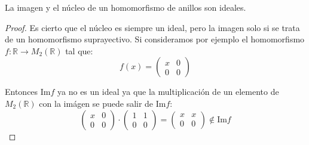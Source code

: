 \begin{ce}
    La imagen y el núcleo de un homomorfismo de anillos son ideales.
\end{ce}

\begin{proof}
    Es cierto que el núcleo es siempre un ideal, pero la imagen solo si se trata de un homomorfismo suprayectivo. Si consideramos por ejemplo el homomorfismo $f:\mathbb{R} \to M_{2}(\mathbb{R})$ tal que:
    \begin{equation}
        f(x) = \begin{pmatrix}
            x & 0\\
            0 & 0
        \end{pmatrix} 
    \end{equation}

    Entonces $\text{Im} f$ ya no es un ideal ya que la multiplicación de un elemento de $M_{2}(\mathbb{R})$ con la imágen se puede salir de $\text{Im} f$:
    \begin{equation}
        \begin{pmatrix}
            x & 0\\
            0 & 0
        \end{pmatrix} 
        \cdot
        \begin{pmatrix}
            1 & 1\\
            0 & 0
        \end{pmatrix} =
        \begin{pmatrix} 
            x & x\\
            0 & 0
        \end{pmatrix} \not\in \text{Im}f
    \end{equation}
\end{proof}
